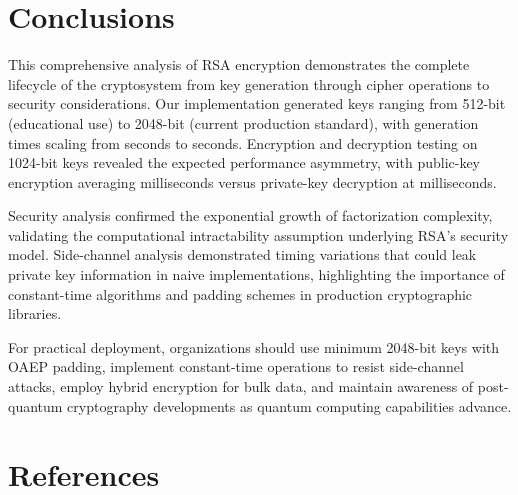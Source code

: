 \documentclass[a4paper, 11pt]{article}
\begin{document}
\section{Conclusions}

This comprehensive analysis of RSA encryption demonstrates the complete lifecycle of the
cryptosystem from key generation through cipher operations to security considerations. Our
implementation generated keys ranging from 512-bit (educational use) to 2048-bit (current
production standard), with generation times scaling from 
seconds to  seconds. Encryption and decryption testing on
1024-bit keys revealed the expected performance asymmetry, with public-key encryption averaging
 milliseconds versus private-key decryption at 
milliseconds.

Security analysis confirmed the exponential growth of factorization complexity, validating the
computational intractability assumption underlying RSA's security model. Side-channel analysis
demonstrated timing variations that could leak private key information in naive implementations,
highlighting the importance of constant-time algorithms and padding schemes in production
cryptographic libraries.

For practical deployment, organizations should use minimum 2048-bit keys with OAEP padding,
implement constant-time operations to resist side-channel attacks, employ hybrid encryption
for bulk data, and maintain awareness of post-quantum cryptography developments as quantum
computing capabilities advance.

\section*{References}
\end{document}
